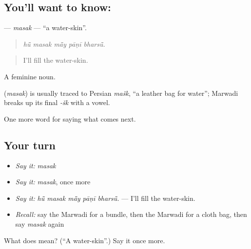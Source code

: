 \subsection*{You'll want to know: }
\textbf{} — \emph{masak} — \textquotedblleft{}a water-skin\textquotedblright{}.

\begin{quote}
    
\end{quote}

\begin{quote}
\emph{hū̃ masak mā̃y pāṇī bharsū̃.}
\end{quote}

\begin{quote}
I'll fill the water-skin.
\end{quote}

A feminine noun.

\begin{cousinweb}
\textbf{} (\emph{masak}) is usually traced to Persian \emph{mašk}, \textquotedblleft{}a leather bag for water\textquotedblright{}; Marwadi breaks up its final \emph{-šk} with a vowel.
\end{cousinweb}

\begin{grammarlens}[title={What you've built}]
One more word for saying what comes next.
\end{grammarlens}

\subsection*{Your turn}
\begin{itemize}
\raggedright
  \item \emph{Say it:} \emph{masak}
  \item \emph{Say it:} \emph{masak}, once more
  \item \emph{Say it:} \emph{hū̃ masak mā̃y pāṇī bharsū̃.} — I'll fill the water-skin.
  \item \emph{Recall:} say the Marwadi for a bundle, then the Marwadi for a cloth bag, then say \emph{masak} again
\end{itemize}

\begin{tcolorbox}[breakable,colback=teal!4,colframe=teal!35!black,title={Before you move on}]
What does  mean? (\textquotedblleft{}A water-skin\textquotedblright{}.) Say it once more.
\end{tcolorbox}
